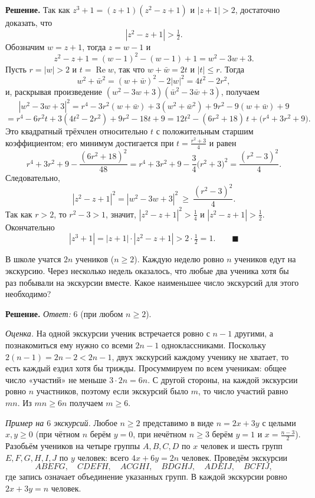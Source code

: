 \if{}
\textbf{Решение.} Так как $z^3+1=(z+1)(z^2-z+1)$ и $|z+1|>2$, достаточно доказать, что
\[
|z^2-z+1|>\tfrac12 .
\]
Обозначим $w=z+1$, тогда $z=w-1$ и
\[
z^2-z+1=(w-1)^2-(w-1)+1=w^2-3w+3 .
\]
Пусть $r=|w|>2$ и $t=\operatorname{Re}w$, так что $w+\bar w=2t$ и $|t|\le r$. Тогда
\[
w^2+\bar w^2=(w+\bar w)^2-2|w|^2=4t^2-2r^2,
\]
и, раскрывая произведение $(w^2-3w+3)(\bar w^2-3\bar w+3)$, получаем
\[
|w^2-3w+3|^2=r^4-3r^2(w+\bar w)+3(w^2+\bar w^2)+9r^2-9(w+\bar w)+9
\]
\[
=r^4-6r^2t+3(4t^2-2r^2)+9r^2-18t+9
=12t^2-(6r^2+18)\,t+\bigl(r^4+3r^2+9\bigr).
\]
Это квадратный трёхчлен относительно $t$ с положительным старшим коэффициентом; его минимум достигается при $t=\frac{r^2+3}{4}$ и равен
\[
r^4+3r^2+9-\frac{(6r^2+18)^2}{48}=r^4+3r^2+9-\frac34\bigl(r^2+3\bigr)^2=\frac{(r^2-3)^2}{4}.
\]
Следовательно,
\[
|z^2-z+1|^2=|w^2-3w+3|^2\ \ge\ \frac{(r^2-3)^2}{4}.
\]
Так как $r>2$, то $r^2-3>1$, значит, $|z^2-z+1|^2>\tfrac14$ и $|z^2-z+1|>\tfrac12$. Окончательно
\[
|z^3+1|=|z+1|\cdot|z^2-z+1|>2\cdot\tfrac12=1 . \qquad \blacksquare
\]
\fi

\q В школе учатся $2n$ учеников ($n\ge 2$). Каждую неделю ровно $n$ учеников едут на экскурсию. Через несколько недель оказалось, что любые два ученика хотя бы раз побывали на экскурсии вместе. Какое наименьшее число экскурсий для этого необходимо?

\if{}
\textbf{Решение.} \emph{Ответ:} $6$ (при любом $n\ge2$).

\emph{Оценка.} На одной экскурсии ученик встречается ровно с $n-1$ другими, а познакомиться ему нужно со всеми $2n-1$ одноклассниками. Поскольку $2(n-1)=2n-2<2n-1$, двух экскурсий каждому ученику не хватает, то есть каждый ездил хотя бы трижды. Просуммируем по всем ученикам: общее число «участий» не меньше $3\cdot 2n=6n$. С другой стороны, на каждой экскурсии ровно $n$ участников, поэтому если экскурсий было $m$, то число участий равно $mn$. Из $mn\ge 6n$ получаем $m\ge 6$.

\emph{Пример на $6$ экскурсий.} Любое $n\ge2$ представимо в виде $n=2x+3y$ с целыми $x,y\ge0$ (при чётном $n$ берём $y=0$, при нечётном $n\ge3$ берём $y=1$ и $x=\frac{n-3}{2}$). Разобьём учеников на четыре группы $A,B,C,D$ по $x$ человек и шесть групп $E,F,G,H,I,J$ по $y$ человек: всего $4x+6y=2n$ человек. Проведём экскурсии
\[
ABEFG,\quad CDEFH,\quad ACGHI,\quad BDGHJ,\quad ADEIJ,\quad BCFIJ,
\]
где запись означает объединение указанных групп. В каждой экскурсии ровно $2x+3y=n$ человек.

